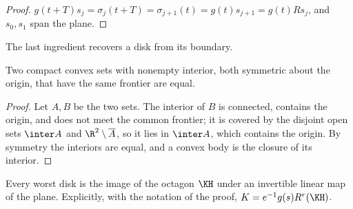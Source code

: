\begin{proof}
$g(t+T)s_j=\sigma_j(t+T)=\sigma_{j+1}(t)=g(t)s_{j+1}=g(t)Rs_j$, and $s_0,s_1$ span the plane.
\end{proof}

The last ingredient recovers a disk from its boundary.

\begin{lemma}\label{lem:eq-frontier}
Two compact convex sets with nonempty interior, both symmetric about the origin, that have the
same frontier are equal.
\end{lemma}

\begin{proof}
Let $A,B$ be the two sets. The interior of $B$ is connected, contains the origin, and does not
meet the common frontier; it is covered by the disjoint open sets $\inter A$ and
$\R^2\setminus\overline A$, so it lies in $\inter A$, which contains the origin. By symmetry the
interiors are equal, and a convex body is the closure of its interior.
\end{proof}

\begin{theorem}[Rigidity]\label{thm:rigidity}
Every worst disk is the image of the octagon $\KH$ under an invertible linear map of the plane.
Explicitly, with the notation of the proof, $K=e^{-1}g(s)R^{r}(\KH)$.
\end{theorem}

